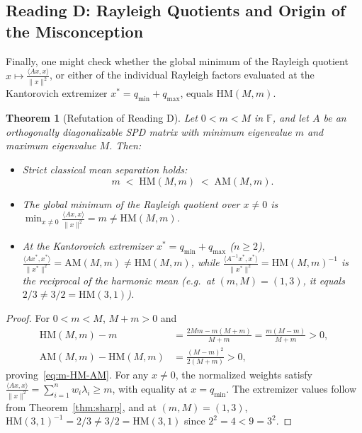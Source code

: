 \documentclass[11pt,a4paper]{article}
\newtheorem{theorem}{Theorem}[section]
\theoremstyle{definition}
\newcommand{\AM}{\mathrm{AM}}
\newcommand{\HM}{\mathrm{HM}}
\begin{document}
\subsection{Reading D: Rayleigh Quotients and Origin of the Misconception}

Finally, one might check whether the global minimum of the Rayleigh quotient
$x \mapsto \frac{\langle Ax, x\rangle}{\|x\|^2}$, or either of the individual
Rayleigh factors evaluated at the Kantorovich extremizer $x^* = q_{\min} + q_{\max}$,
equals $\HM(M, m)$.

\begin{theorem}[Refutation of Reading D]
\label{thm:readingD}
Let $0 < m < M$ in $\mathbb{F}$, and let $A$ be an orthogonally diagonalizable
SPD matrix with minimum eigenvalue $m$ and maximum eigenvalue $M$. Then:
\begin{itemize}
  \item[(i)] Strict classical mean separation holds:
  \begin{equation}
    \label{eq:m-HM-AM}
    m \;<\; \HM(M, m) \;<\; \AM(M, m).
  \end{equation}
  \item[(ii)] The global minimum of the Rayleigh quotient over $x \ne 0$ is
  $\min_{x \ne 0} \frac{\langle Ax, x\rangle}{\|x\|^2} = m \ne \HM(M, m)$.
  \item[(iii)] At the Kantorovich extremizer $x^* = q_{\min} + q_{\max}$ ($n \ge 2$),
  $\frac{\langle Ax^*, x^*\rangle}{\|x^*\|^2} = \AM(M,m) \ne \HM(M,m)$, while
  $\frac{\langle A^{-1}x^*, x^*\rangle}{\|x^*\|^2} = \HM(M,m)^{-1}$ is the
  \emph{reciprocal} of the harmonic mean (e.g.\ at $(m,M) = (1,3)$, it equals
  $2/3 \ne 3/2 = \HM(3,1)$).
\end{itemize}
\end{theorem}
\begin{proof}
For $0 < m < M$, $M + m > 0$ and
\begin{align*}
  \HM(M,m) - m &= \frac{2Mm - m(M+m)}{M+m} = \frac{m(M - m)}{M + m} > 0, \\
  \AM(M,m) - \HM(M,m) &= \frac{(M - m)^2}{2(M + m)} > 0,
\end{align*}
proving~\eqref{eq:m-HM-AM}. For any $x \ne 0$, the normalized weights satisfy
$\frac{\langle Ax, x\rangle}{\|x\|^2} = \sum_{i=1}^n w_i\lambda_i \ge m$, with
equality at $x = q_{\min}$. The extremizer values follow from
Theorem~\ref{thm:sharp}, and at $(m,M) = (1,3)$,
$\HM(3,1)^{-1} = 2/3 \ne 3/2 = \HM(3,1)$ since $2^2 = 4 < 9 = 3^2$.
\end{proof}
\end{document}
